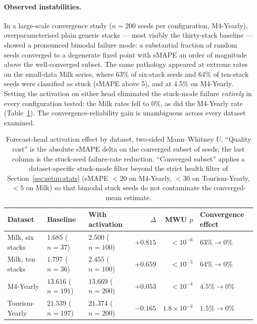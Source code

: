 \paragraph{Observed instabilities.} In a large-scale convergence study
($n = 200$ seeds per configuration, M4-Yearly), overparameterised plain
generic stacks --- most visibly the thirty-stack baseline --- showed a
pronounced bimodal failure mode: a substantial fraction of random seeds
converged to a degenerate fixed point with sMAPE an order of magnitude
above the well-converged subset. The same pathology appeared at extreme
rates on the small-data Milk series, where 63\% of six-stack seeds and
64\% of ten-stack seeds were classified as stuck (sMAPE above 5), and at
4.5\% on M4-Yearly. Setting the activation on either head eliminated the
stuck-mode failure \emph{entirely} in every configuration tested: the Milk
rates fell to 0\%, as did the M4-Yearly rate
(Table~\ref{tab:active_g_ablation}). The convergence-reliability gain is
unambiguous across every dataset examined.

\begin{table}[h]
\centering
\small
\caption{Forecast-head activation effect by dataset, two-sided
Mann--Whitney $U$. ``Quality cost'' is the absolute sMAPE delta on the
converged subset of seeds; the last column is the stuck-seed failure-rate
reduction. ``Converged subset'' applies a dataset-specific stuck-mode
filter beyond the strict health filter of Section~\ref{sec:setup:stats}
(sMAPE $< 20$ on M4-Yearly, $< 30$ on Tourism-Yearly, $< 5$ on Milk) so
that bimodal stuck seeds do not contaminate the converged-mean estimate.}
\label{tab:active_g_ablation}
\begin{tabular}{@{}lllrrl@{}}
\toprule
Dataset & Baseline & With activation & $\Delta$ & MWU $p$ & Convergence effect \\
\midrule
Milk, six stacks & $1.685$ ($n{=}37$) & $2.500$ ($n{=}100$) & $+0.815$ & $<10^{-6}$ & $63\% \to 0\%$ \\
Milk, ten stacks & $1.797$ ($n{=}36$) & $2.455$ ($n{=}100$) & $+0.659$ & $<10^{-5}$ & $64\% \to 0\%$ \\
M4-Yearly        & $13.616$ ($n{=}191$) & $13.669$ ($n{=}200$) & $+0.053$ & $<10^{-4}$ & $4.5\% \to 0\%$ \\
Tourism-Yearly   & $21.539$ ($n{=}197$) & $21.374$ ($n{=}200$) & $-0.165$ & $1.8\times10^{-4}$ & $1.5\% \to 0\%$ \\
\bottomrule
\end{tabular}
\end{table}

